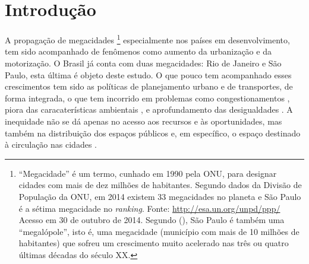 \chapter{Introdução}

A propagação de megacidades
\footnote{``Megacidade'' é um termo, cunhado em 1990 pela ONU, para designar cidades com mais de dez milhões de habitantes. Segundo dados da Divisão de População da ONU, em 2014 existem 33 megacidades no planeta e São Paulo é a sétima megacidade no \emph{ranking}. Fonte: \url{http://esa.un.org/unpd/ppp/} Acesso em 30 de outubro de 2014.
Segundo  (\citeyear{FREITAG2007}), São Paulo é também uma ``megalópole'', isto é, uma megacidade (município com mais de 10 milhões de habitantes) que sofreu um crescimento muito acelerado nas três ou quatro últimas décadas do século XX.}
%
especialmente nos países em desenvolvimento, tem sido acompanhado de fenômenos como aumento da urbanização e da motorização. O Brasil já conta com duas megacidades: Rio de Janeiro e São Paulo, esta última é objeto deste estudo.
O que pouco tem acompanhado esses crescimentos tem sido as políticas de planejamento urbano e de transportes, de forma integrada, o que tem incorrido em problemas como congestionamentos \cite{KINGHAM2001,STENG2005,METZ2012}, piora das caracaterísticas ambientais \cite{TERTOOLEN1998,RICHARDSON2005,BANISTER2011}, e aprofundamento das desigualdades \cite{HODGE1995,AHMED2008,LEWIS2011}.
A inequidade não se dá apenas no acesso aos recursos e às oportunidades, mas também na distribuição dos espaços públicos \cite{ALVA1997} e, em específico, o espaço destinado à circulação nas cidades \cite{VASCONCELLOS2012}.

